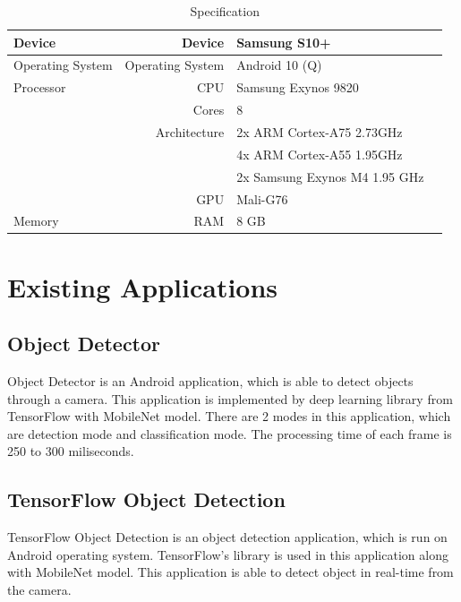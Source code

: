         \begin{table}[!htp]\centering
            \scriptsize
            \begin{tabular}{lrll}\toprule
                Device              &Device             &Samsung S10+ \\ \hline
                Operating System    &Operating System   &Android 10 (Q) \\ \hline
                Processor           &CPU                &Samsung Exynos 9820 \\
                                    &Cores              &8 \\
                                    &Architecture       &2x ARM Cortex-A75 2.73GHz \\
                                    &                   &4x ARM Cortex-A55 1.95GHz \\
                                    &                   &2x Samsung Exynos M4 1.95 GHz \\
                                    &GPU                &Mali-G76 \\ \hline
                Memory              &RAM                &8 GB \\
                \bottomrule
            \end{tabular}

            \caption{Specification}\label{specification}
        \end{table}


    \section{Existing Applications}
        \subsection{Object Detector}
            Object Detector is an Android application, which is able to detect objects through a camera.
            This application is implemented by deep learning library from TensorFlow with
            MobileNet model. There are 2 modes in this application,
            which are detection mode and classification mode.
            The processing time of each frame is 250 to 300 miliseconds.

        \subsection{TensorFlow Object Detection}
            TensorFlow Object Detection is an object detection application,
            which is run on Android operating system.
            TensorFlow's library is used in this application along with MobileNet model.
            This application is able to detect object in real-time from the camera.


